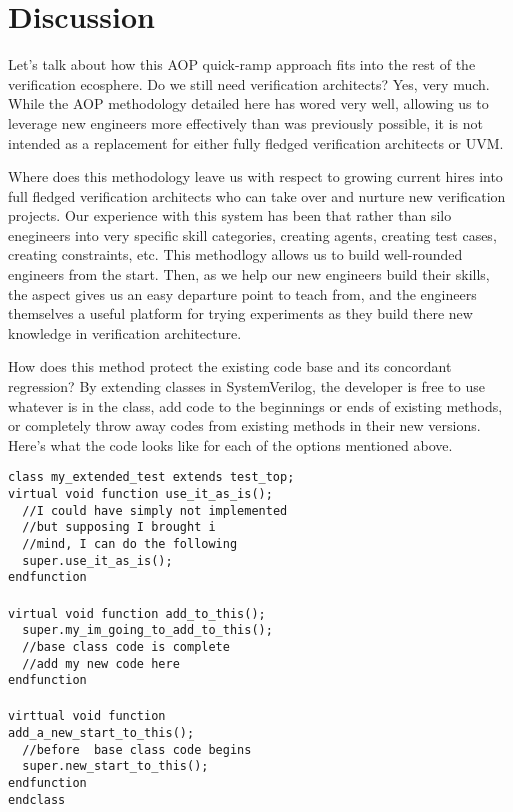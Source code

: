 \documentclass[twocolumn,letterpaper]{IEEEAerospaceCLS}  %
\begin{document}
\section{Discussion}
Let's talk about how this AOP quick-ramp approach fits into the rest of the verification ecosphere. Do we still need verification architects? Yes, very much. While the AOP methodology detailed here has wored very well, allowing us to leverage new engineers more effectively than was previously possible, it is not intended as a replacement for either fully fledged verification architects or UVM. 

Where does this methodology leave us with respect to growing current hires into full fledged verification architects who can take over and nurture new verification projects. Our experience with this system has been that rather than silo enegineers into very specific skill categories, creating agents, creating test cases, creating constraints, etc. This methodlogy allows us to build well-rounded engineers from the start. Then, as we help our new engineers build their skills, the aspect gives us an easy departure point to teach from, and the engineers themselves a useful platform for trying experiments as they build there new knowledge in verification architecture.

How does this method protect the existing code base and its concordant regression? By extending classes in SystemVerilog, the developer is free to use whatever is in the class, add code to the beginnings or ends of existing methods, or completely throw away codes from existing methods in their new versions. Here's what the code looks like for each of the options mentioned above.

\verb|class my_extended_test extends test_top;|
\\
\verb|virtual void function use_it_as_is();|
\\
\verb|  //I could have simply not implemented |
\\
\verb|  //but supposing I brought i |
\\
\verb|  //mind, I can do the following|
\\
\verb|  super.use_it_as_is();|
\\
\verb|endfunction|
\\
\\
\verb|virtual void function add_to_this();|
\\
\verb|  super.my_im_going_to_add_to_this();|
\\
\verb|  //base class code is complete|
\\
\verb|  //add my new code here|
\\
\verb|endfunction|
\\
\\
\verb|virttual void function |
\\
\verb|add_a_new_start_to_this();|
\\
\verb|  //before  base class code begins|
\\
\verb|  super.new_start_to_this();|
\\
\verb|endfunction|
\\
\verb|endclass|
\\
\end{document}
